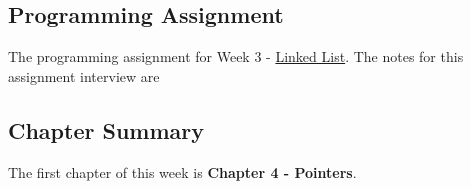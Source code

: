 \subsection{Programming Assignment}

The programming assignment for Week 3 - \href{https://github.com/QuantumCompiler/CU/tree/main/CSPB%202270%20-%20Data%20Structures/CSPB%202270%20-%20Programming%20Assignments/CSPB%202270%20-%20Assignment%202%20-%20Linked%20List}{Linked List}. 
The notes for this assignment interview are 

\subsection{Chapter Summary}

The first chapter of this week is \textbf{Chapter 4 - Pointers}.

